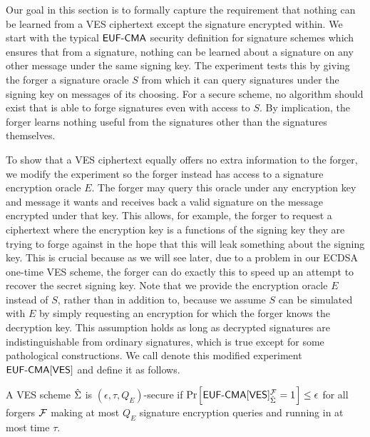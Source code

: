 Our goal in this section is to formally capture the requirement that nothing can be learned from a VES ciphertext except the signature encrypted within.
We start with the typical $\textsf{EUF-CMA}$ security definition for signature schemes which ensures that from a signature, nothing can be learned about a signature on any other message under the same signing key.
The experiment tests this by giving the forger a signature oracle $S$ from which it can query signatures under the signing key on messages of its choosing.
For a secure scheme, no algorithm should exist that is able to forge signatures even with access to $S$.
By implication, the forger learns nothing useful from the signatures other than the signatures themselves.

To show that a VES ciphertext equally offers no extra information to the forger, we modify the experiment so the forger instead has access to a signature encryption oracle $E$.
The forger may query this oracle under any encryption key and message it wants and receives back a valid signature on the message encrypted under that key.
This allows, for example, the forger to request a ciphertext where the encryption key is a functions of the signing key they are trying to forge against in the hope that this will leak something about the signing key.
This is crucial because as we will see later, due to a problem in our ECDSA one-time VES scheme, the forger can do exactly this to speed up an attempt to recover the secret signing key.
Note that we provide the encryption oracle $E$ instead of $S$, rather than in addition to, because we assume $S$ can be simulated with $E$ by simply requesting an encryption for which the forger knows the decryption key.
This assumption holds as long as decrypted signatures are indistinguishable from ordinary signatures, which is true except for some pathological constructions\cite{calderon2014rethinking}.
We call denote this modified experiment $\textsf{EUF-CMA}[\textsf{VES}]$ and define it as follows.

\begin{definition}[\EUFCMAVES]
  A VES scheme $\hat{\Sigma}$ is $(\epsilon, \tau, Q_E)$-\EUFCMAVES secure if $\prob{ \EUFCMAVES^{\F}_{\hat{\Sigma}} = 1} \leq \epsilon$ for all forgers $\mathcal{F}$ making at most $Q_E$ signature encryption queries and running in at most time $\tau$.
\begin{center}
\end{center}
\end{definition}

